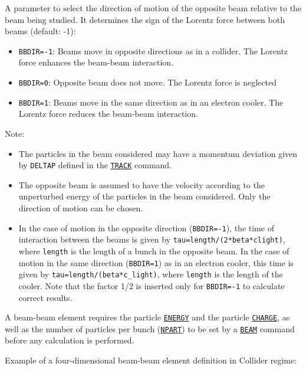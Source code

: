 \begin{madlist}
    A parameter to select the direction of motion of the
     opposite beam relative to the beam being studied. It determines
     the sign of the Lorentz force between both beams (default: -1):
     \begin{itemize}
        \item  \texttt{BBDIR=-1}: Beams move in opposite directions as in a
        collider. The Lorentz force enhances the beam-beam interaction.
        \item  \texttt{BBDIR=0}: Opposite beam does not move. The Lorentz force is
        neglected
        \item  \texttt{BBDIR=1}: Beams move in the same direction as in an
        electron cooler. The Lorentz force reduces the beam-beam interaction.
     \end{itemize}
     Note:
     \begin{itemize}
        \item  The particles in the beam considered may have a momentum
        deviation given by \texttt{DELTAP} defined in the
        \hyperref[sec:track]{\texttt{TRACK}} command.
        \item  The opposite beam is assumed to have the velocity according to
        the unperturbed energy of the particles in the beam considered. Only
        the direction of motion can be chosen.
        \item  In the case of motion in the opposite direction
        (\texttt{BBDIR=-1}), the time of interaction between the beams
        is given by \texttt{tau=length/(2*beta*clight)}, where
        \texttt{length} is the length of a bunch in the opposite beam.
        In the case of motion in the same direction (\texttt{BBDIR=1})
        as in an electron cooler, this time is given by
        \texttt{tau=length/(beta*c\_light)}, where \texttt{length} is
        the length of the cooler. Note that the factor 1/2 is inserted
        only for \texttt{BBDIR=-1} to calculate correct results.
     \end{itemize}

\end{madlist}


A beam-beam element requires the particle
\hyperref[sec:beam]{\texttt{ENERGY}} and the particle
\hyperref[sec:beam]{\texttt{CHARGE}}, as well as the number of particles
per bunch (\hyperref[sec:beam]{\texttt{NPART}}) to be set by a
\hyperref[sec:beam]{\texttt{BEAM}} command before any
calculation is performed.

Example of a four-dimensional beam-beam element definition in Collider
regime:


